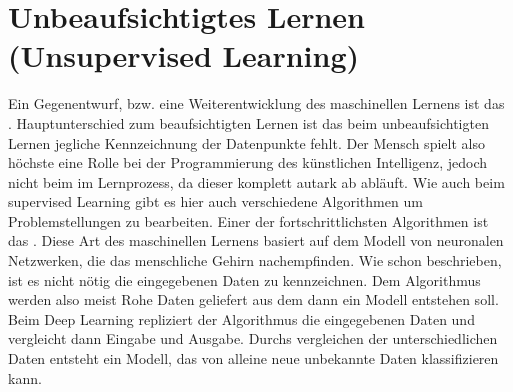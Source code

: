 \documentclass[a4paper,12pt,german,ngerman]{report}
\begin{document}
    \section{Unbeaufsichtigtes Lernen (Unsupervised Learning) }
        Ein Gegenentwurf, bzw. eine Weiterentwicklung des maschinellen Lernens ist das .
        Hauptunterschied zum beaufsichtigten Lernen ist das beim unbeaufsichtigten Lernen jegliche Kennzeichnung der Datenpunkte fehlt.
        Der Mensch spielt also höchste eine Rolle bei der Programmierung des künstlichen Intelligenz, jedoch nicht beim
        im Lernprozess, da dieser komplett autark ab abläuft. Wie auch beim supervised Learning gibt es hier auch verschiedene
        Algorithmen um Problemstellungen zu bearbeiten. Einer der fortschrittlichsten Algorithmen ist das .
        Diese Art des maschinellen Lernens basiert auf dem Modell von neuronalen Netzwerken, die das menschliche
        Gehirn nachempfinden.\cite[how deep learning works]{ibm2021deeplearning}
        Wie schon beschrieben, ist es nicht nötig die eingegebenen Daten zu kennzeichnen. Dem Algorithmus werden also
        meist Rohe Daten geliefert aus dem dann ein Modell entstehen soll. Beim Deep Learning repliziert der Algorithmus
        die eingegebenen Daten und vergleicht dann Eingabe und Ausgabe. Durchs vergleichen der unterschiedlichen Daten
        entsteht ein Modell, das von alleine neue unbekannte Daten klassifizieren kann.




\end{document}
